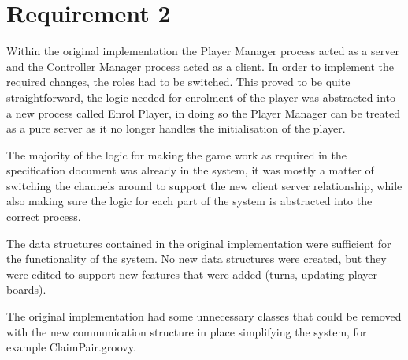 \documentclass[10pt, a4paper]{article}
\title{\mytitle}
\author{\myauthor\hspace{1em}\\\contact\\Edinburgh Napier University\hspace{0.5em}-\hspace{0.5em}\mymodule}
\date{}
\begin{document}
	\maketitle	
	
	
	\section{Requirement 2}
	

	
	Within the original implementation the Player Manager process acted as a server and the Controller Manager process acted as a client. In order to implement the required changes, the roles had to be switched. This proved to be quite straightforward, the logic needed for enrolment of the player was abstracted into a new process called Enrol Player, in doing so the Player Manager can be treated as a pure server as it no longer handles the initialisation of the player. 
	
	The majority of the logic for making the game work as required in the specification document was already in the system, it was mostly a matter of switching the channels around to support the new client server relationship, while also making sure the logic for each part of the system is abstracted into the correct process.

	The data structures contained in the original implementation were sufficient for the functionality of the system. No new data structures were created, but they were edited to support new features that were added (turns, updating player boards).
	
	The original implementation had some unnecessary classes that could be removed with the new communication structure in place simplifying the system, for example ClaimPair.groovy.
	
	
	
	
	
\end{document}
